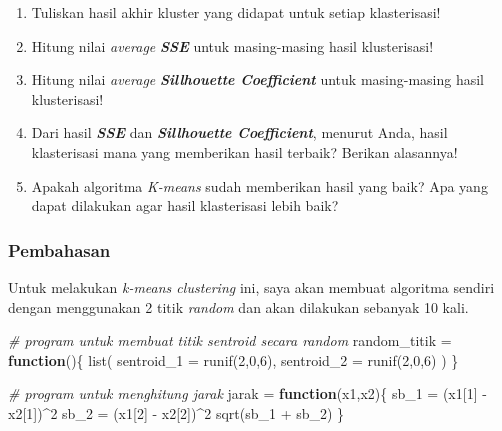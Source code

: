 \documentclass[
]{article}
\newenvironment{Shaded}{\begin{snugshade}}{\end{snugshade}}
\newcommand{\AttributeTok}[1]{\textcolor[rgb]{0.77,0.63,0.00}{#1}}
\newcommand{\CommentTok}[1]{\textcolor[rgb]{0.56,0.35,0.01}{\textit{#1}}}
\newcommand{\ControlFlowTok}[1]{\textcolor[rgb]{0.13,0.29,0.53}{\textbf{#1}}}
\newcommand{\DecValTok}[1]{\textcolor[rgb]{0.00,0.00,0.81}{#1}}
\newcommand{\FunctionTok}[1]{\textcolor[rgb]{0.00,0.00,0.00}{#1}}
\newcommand{\NormalTok}[1]{#1}
\newcommand{\OtherTok}[1]{\textcolor[rgb]{0.56,0.35,0.01}{#1}}
\newcommand{\SpecialCharTok}[1]{\textcolor[rgb]{0.00,0.00,0.00}{#1}}
\providecommand{\tightlist}{%
  \setlength{\itemsep}{0pt}\setlength{\parskip}{0pt}}
\begin{document}
\begin{enumerate}
\def\labelenumi{\arabic{enumi}.}
\tightlist
\item
  Tuliskan hasil akhir kluster yang didapat untuk setiap klasterisasi!
\item
  Hitung nilai \emph{average} \textbf{\emph{SSE}} untuk masing-masing
  hasil klusterisasi!
\item
  Hitung nilai \emph{average} \textbf{\emph{Sillhouette Coefficient}}
  untuk masing-masing hasil klusterisasi!
\item
  Dari hasil \textbf{\emph{SSE}} dan \textbf{\emph{Sillhouette
  Coefficient}}, menurut Anda, hasil klasterisasi mana yang memberikan
  hasil terbaik? Berikan alasannya!
\item
  Apakah algoritma \emph{K-means} sudah memberikan hasil yang baik? Apa
  yang dapat dilakukan agar hasil klasterisasi lebih baik?
\end{enumerate}

\hypertarget{pembahasan}{%
\subsubsection{Pembahasan}\label{pembahasan}}

Untuk melakukan \emph{k-means clustering} ini, saya akan membuat
algoritma sendiri dengan menggunakan 2 titik \emph{random} dan akan
dilakukan sebanyak 10 kali.

\begin{Shaded}
\begin{Highlighting}[]
\CommentTok{\# program untuk membuat titik sentroid secara random}
\NormalTok{random\_titik }\OtherTok{=} \ControlFlowTok{function}\NormalTok{()\{}
  \FunctionTok{list}\NormalTok{(}
    \AttributeTok{sentroid\_1 =} \FunctionTok{runif}\NormalTok{(}\DecValTok{2}\NormalTok{,}\DecValTok{0}\NormalTok{,}\DecValTok{6}\NormalTok{),}
    \AttributeTok{sentroid\_2 =} \FunctionTok{runif}\NormalTok{(}\DecValTok{2}\NormalTok{,}\DecValTok{0}\NormalTok{,}\DecValTok{6}\NormalTok{)}
\NormalTok{  )}
\NormalTok{\}}

\CommentTok{\# program untuk menghitung jarak}
\NormalTok{jarak }\OtherTok{=} \ControlFlowTok{function}\NormalTok{(x1,x2)\{}
\NormalTok{  sb\_1 }\OtherTok{=}\NormalTok{ (x1[}\DecValTok{1}\NormalTok{] }\SpecialCharTok{{-}}\NormalTok{ x2[}\DecValTok{1}\NormalTok{])}\SpecialCharTok{\^{}}\DecValTok{2}
\NormalTok{  sb\_2 }\OtherTok{=}\NormalTok{ (x1[}\DecValTok{2}\NormalTok{] }\SpecialCharTok{{-}}\NormalTok{ x2[}\DecValTok{2}\NormalTok{])}\SpecialCharTok{\^{}}\DecValTok{2}
  \FunctionTok{sqrt}\NormalTok{(sb\_1 }\SpecialCharTok{+}\NormalTok{ sb\_2)}
\NormalTok{\}}
\end{Highlighting}
\end{Shaded}
\end{document}
